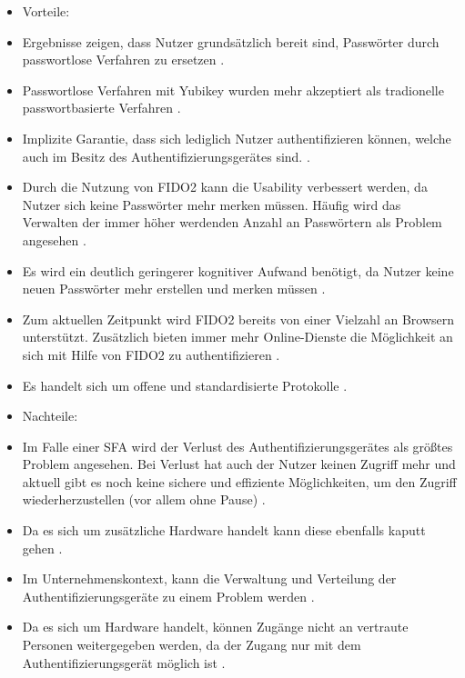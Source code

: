 \begin{itemize}
    \item Vorteile:
    \item Ergebnisse zeigen, dass Nutzer grundsätzlich bereit sind, Passwörter durch passwortlose Verfahren zu ersetzen \cite{lyastani2020fido2}.
    \item Passwortlose Verfahren mit Yubikey wurden mehr akzeptiert als tradionelle passwortbasierte Verfahren \cite{lyastani2020fido2}.
    \item Implizite Garantie, dass sich lediglich Nutzer authentifizieren können, welche auch im Besitz des Authentifizierungsgerätes sind. \cite{lyastani2020fido2}.
    \item Durch die Nutzung von FIDO2 kann die Usability verbessert werden, da Nutzer sich keine Passwörter mehr merken müssen. Häufig wird das Verwalten der immer höher werdenden Anzahl an Passwörtern als Problem angesehen \cite{lyastani2020fido2} \cite{farke2020you}.
    \item Es wird ein deutlich geringerer kognitiver Aufwand benötigt, da Nutzer keine neuen Passwörter mehr erstellen und merken müssen \cite{lyastani2020fido2}.
    \item Zum aktuellen Zeitpunkt wird FIDO2 bereits von einer Vielzahl an Browsern unterstützt. Zusätzlich bieten immer mehr Online-Dienste die Möglichkeit an sich mit Hilfe von FIDO2 zu authentifizieren \cite{lyastani2020fido2} \cite{farke2020you}.
    \item Es handelt sich um offene und standardisierte Protokolle \cite{farke2020you}.
    \item Nachteile:
    \item Im Falle einer \ac{SFA} wird der Verlust des Authentifizierungsgerätes als größtes Problem angesehen. Bei Verlust hat auch der Nutzer keinen Zugriff mehr und aktuell gibt es noch keine sichere und effiziente Möglichkeiten, um den Zugriff wiederherzustellen (vor allem ohne Pause) \cite{lyastani2020fido2}.
    \item Da es sich um zusätzliche Hardware handelt kann diese ebenfalls kaputt gehen \cite{farke2020you}.
    \item Im Unternehmenskontext, kann die Verwaltung und Verteilung der Authentifizierungsgeräte zu einem Problem werden \cite{farke2020you}. 
    \item Da es sich um Hardware handelt, können Zugänge nicht an vertraute Personen weitergegeben werden, da der Zugang nur mit dem Authentifizierungsgerät möglich ist \cite{lyastani2020fido2}.

\end{itemize}
